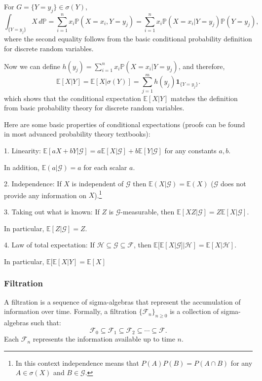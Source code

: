 \documentclass[letter,11pt]{article}
\begin{document}
For \( G = \{Y = y_j\} \in \sigma(Y) \),
\[
\int_{\{Y = y_j\}} X \, d\mathbb{P} = \sum_{i=1}^n x_i \mathbb{P}(X = x_i, Y = y_j) = \sum_{i=1}^n x_i \mathbb{P}(X = x_i | Y = y_j) \mathbb{P}(Y = y_j),
\]
where the second equality follows from the basic conditional probability definition for discrete random variables.

Now we can define \( h(y_{j}) = \sum_{i=1}^n x_i \mathbb{P}(X = x_i | Y = y_j) \), and therefore,
\[
\mathbb{E}[X | Y] = \mathbb{E}[X | \sigma(Y)] =  \sum_{j=1}^m h(y_{j}) \mathbf{1}_{\{Y = y_j\}}.
\]
which shows that the conditional expectation \( \mathbb{E}[X | Y] \) matches the definition from basic probability theory for discrete random variables.


Here are some basic properties of conditional expectations (proofs can be found in most advanced probability theory textbooks): 

1. Linearity: \( \mathbb{E}[aX + bY | \mathcal{G}] = a\mathbb{E}[X | \mathcal{G}] + b\mathbb{E}[Y | \mathcal{G}] \) for any constants \( a, b \). 

In addition, $\mathbb{E}(a|\mathcal{G}) = a$ for each scalar $a$. 

2. Independence: If $X$ is independent of $\mathcal{G}$ then $\mathbb{E} (X | \mathcal{G}) = \mathbb{E}(X)$ ($\mathcal{G}$ does not provide any information on $X$).\footnote{In this context independence means that $P(A)P(B) = P(A \cap B)$ for any $A \in \sigma(X)$ and $B \in \mathcal{G}$.} 

3. Taking out what is known: If \( Z \) is \( \mathcal{G} \)-measurable, then \( \mathbb{E}[XZ | \mathcal{G}] = Z\mathbb{E}[X | \mathcal{G}] \). 

In particular, \( \mathbb{E}[Z | \mathcal{G}] = Z \). 

4. Law of total expectation: If \( \mathcal{H} \subseteq \mathcal{G} \subseteq \mathcal{F} \), then \( \mathbb{E}[\mathbb{E}[X | \mathcal{G}] | \mathcal{H}] = \mathbb{E}[X | \mathcal{H}] \).

In particular, $\mathbb{E} [\mathbb{E}[X | Y ] = \mathbb{E}[X]$

\subsubsection{Filtration}
A filtration is a sequence of sigma-algebras that represent the accumulation of information over time. Formally, a filtration \( \{\mathcal{F}_n\}_{n \geq 0} \) is a collection of sigma-algebras such that:
\[
\mathcal{F}_0 \subseteq \mathcal{F}_1 \subseteq \mathcal{F}_2 \subseteq \cdots \subseteq \mathcal{F}.
\]
Each \( \mathcal{F}_n \) represents the information available up to time \( n \).
\end{document}
